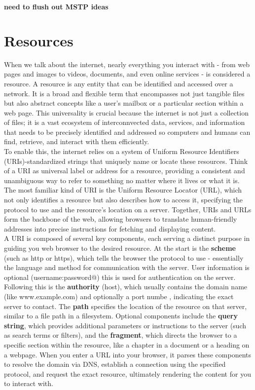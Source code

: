 \documentclass{article}
\begin{document}
\textbf{need to flush out MSTP ideas}


\section*{Resources}
When we talk about the internet, nearly everything you interact with - from web pages and images to videos, documents, and even online services - is considered a resource. A resource is any entity that can be identified and accessed over a network. It is a broad and flexible term that encompasses not just tangible files but also abstract concepts like a user's mailbox or a particular section within a web page. This universality is crucial because the internet is not just a collection of files; it is a vast ecosystem of interconnvected data, services, and information that needs to be precisely identified and addressed so computers and humans can find, retrieve, and interact with them efficiently.\\

To enable this, the internet relies on a system of Uniform Resource Identifiers (URIs)-standardized strings that uniquely name or locate these resources. Think of a URI as universal label or address for a resource, providing a consistent and unambiguous way to refer to something no matter where it lives or what it is. The most familiar kind of URI is the Uniform Resource Locator (URL), which not only identifies a resource but also describes how to access it, specifying the protocol to use and the resource's location on a server. Together, URIs and URLs form the backbone of the web, allowing browsers to translate human-friendly addresses into precise instructions for fetching and displaying content.\\

A URI is composed of several key components, each serving a distinct purpose in guiding you web browser to the desired resource. At the start is the \textbf{scheme} (such as http or https), which tells the browser the protocol to use - essentially the language and method for communication with the server. User information is optional (username:password@) this is used for authentication on the server. Following this is the \textbf{authority} (host), which usually contains the domain name (like www.example.com) and optionally a port numbe , indicating the exact server to contact. The \textbf{path} specifies the location of the resource on that server, similar to a file path in a filesystem. Optional components include the \textbf{query string}, which provides additional parameters or instructions to the server (such as search terms or filters), and the \textbf{fragment}, which directs the browser to a specific section within the resource, like a chapter in a document or a heading on a webpage. When you enter a URL into your browser, it parses these components to resolve the domain via DNS, establish a connection using the specified protocol, and request the exact resource, ultimately rendering the content for you to interact with.
\end{document}
